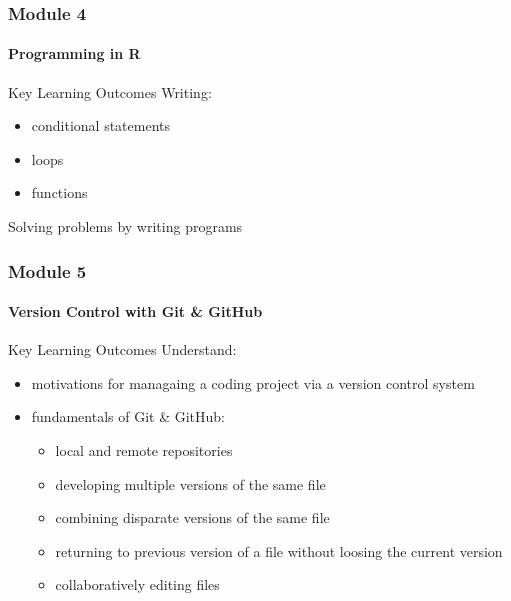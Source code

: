 \documentclass[xcolor=dvipsnames]{beamer}
\begin{document}
\begin{frame}
\frametitle{Module 4}
\framesubtitle{Programming in R}
\begin{block}{Key Learning Outcomes}
Writing:
\begin{itemize}
\item conditional statements
\item loops
\item functions
\newline
\end{itemize}
Solving problems by writing programs
\end{block}
\end{frame}

\begin{frame}
\frametitle{Module 5}
\framesubtitle{Version Control with Git \& GitHub}
\begin{block}{Key Learning Outcomes}
Understand:
\begin{itemize}
\item motivations for managaing a coding project via a version control system
\item fundamentals of Git \& GitHub: \begin{itemize}
  \item local and remote repositories
  \item developing multiple versions of the same file
  \item combining disparate versions of the same file
  \item returning to previous version of a file without loosing the current version
  \item collaboratively editing files
  \end{itemize}
\end{itemize}
\end{block}
\end{frame}
\end{document}
